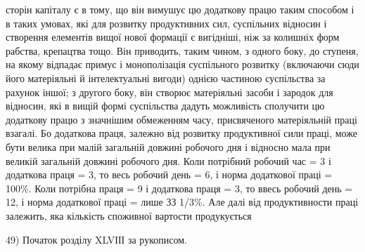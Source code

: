 сторін капіталу є в тому, що він вимушує цю додаткову працю
таким способом і в таких умовах, які для розвитку продуктивних сил, суспільних
відносин і створення елементів вищої нової формації є вигідніші, ніж за колишніх
форм рабства, крепацтва тощо. Він приводить, таким чином, з одного боку, до
ступеня, на якому відпадає примус і монополізація суспільного розвитку (включаючи
сюди його матеріяльні й інтелектуальні вигоди) однією частиною суспільства
за рахунок іншої; з другого боку, він створює матеріяльні засоби
і зародок для відносин, які в вищій формі суспільства дадуть можливість сполучити
цю додаткову працю з значнішим обмеженням часу, присвяченого матеріяльній
праці взагалі. Бо додаткова праця, залежно від розвитку продуктивної
сили праці, може бути велика при малій загальній довжині робочого дня і відносно
мала при великій загальній довжині робочого дня. Коли потрібний робочий
час = 3 і додаткова праця = 3, то весь робочий день = 6, і норма додаткової
праці = 100\%. Коли потрібна праця = 9 і додаткова праця = 3, то ввесь
робочий день = 12, і норма додаткової праці = лише ЗЗ 1/3\%. Але далі від продуктивности
праці залежить, яка кількість споживної вартости продукується

49) Початок розділу XLVІІІ за рукописом.
